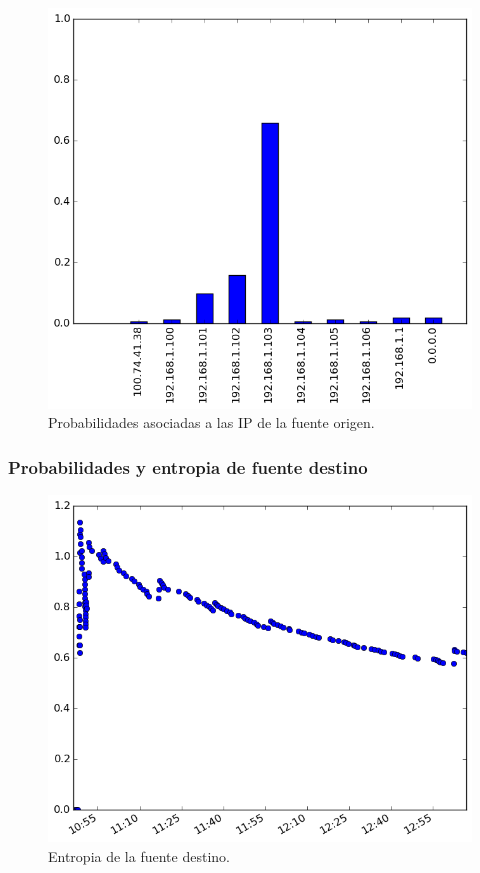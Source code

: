 \begin{figure}[h!]
  \centering
	\includegraphics[scale=0.66]{../experimentacion-svilerino/casa/histogram_src_probabilities.png}
  \caption{Probabilidades asociadas a las IP de la fuente origen.}
\end{figure}


\subsubsection{Probabilidades y entropia de fuente destino}
\begin{figure}[h!]
  \centering
	\includegraphics[scale=0.66]{../experimentacion-svilerino/casa/entropy_dst.png}
  \caption{Entropia de la fuente destino.}
\end{figure}

